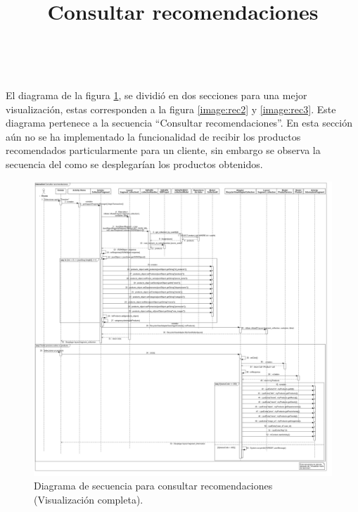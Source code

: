 \title{\textbf{Consultar recomendaciones}}
\\ \par
El diagrama de la figura \ref{image:rec1}, se dividió en dos secciones para una mejor visualización, estas corresponden a la figura \ref{image:rec2} y \ref{image:rec3}. Este diagrama pertenece a la secuencia ``Consultar recomendaciones''. En esta sección aún no se ha implementado la funcionalidad de recibir los productos recomendados particularmente para un cliente, sin embargo se observa la secuencia del como se desplegarían los productos obtenidos.
\FloatBarrier
\begin{figure}[htbp!]
		\centering
			\includegraphics[width=1.1 \textwidth]{imagenes/Diagramas_UserApp/Nuevos_diagramas/Recomendaciones}
		\caption{Diagrama de secuencia para consultar recomendaciones (Visualización completa).}
		\label{image:rec1}
\end{figure}
\FloatBarrier


